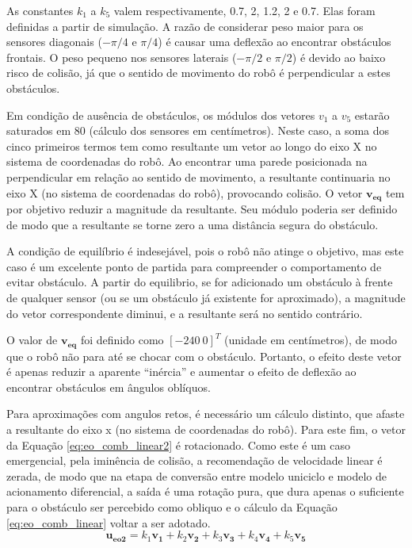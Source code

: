 		As constantes $k_1$ a $k_5$ valem respectivamente, 0.7, 2, 1.2, 2 e 0.7. Elas
		foram definidas a partir de simulação. A razão de considerar peso maior para os sensores
		diagonais ($-\pi/4$ e $\pi/4$) é causar uma deflexão ao encontrar obstáculos frontais. 
		O peso pequeno nos sensores laterais ($-\pi/2$ e $\pi/2$) é devido ao baixo risco de 
		colisão, já que o sentido de movimento do robô é perpendicular a estes obstáculos.
		
		Em condição de ausência de obstáculos, os módulos dos vetores $v_1$ a $v_5$ estarão 
		saturados em 80 (cálculo dos sensores em centímetros). Neste caso, a soma dos cinco 
		primeiros termos tem como resultante um vetor ao longo do eixo X no sistema de 
		coordenadas do robô. Ao encontrar uma parede posicionada na perpendicular em relação 
		ao sentido de movimento, a resultante continuaria no eixo X (no sistema de coordenadas 
		do robô), provocando colisão. 
		O vetor $\mathbf{v_{eq}}$ tem por objetivo reduzir a magnitude da resultante. Seu
		módulo poderia ser definido de modo que a resultante se torne zero a uma distância 
		segura do obstáculo. 
		
		A condição de equilíbrio é indesejável, pois o robô não atinge o objetivo, mas 
		este caso é um excelente ponto de partida para compreender o comportamento
		de evitar obstáculo. A partir do equilibrio, se for adicionado um obstáculo à frente de
		qualquer sensor (ou se um obstáculo já existente for aproximado), a magnitude do vetor
		correspondente diminui, e a resultante será no sentido contrário.
		
		O valor de $\mathbf{v_{eq}}$ foi definido como $[-240 \ 0]^T$ (unidade em centímetros), 
		de modo que o robô não para até se chocar com o obstáculo. Portanto, o efeito deste 
		vetor é apenas reduzir a aparente ``inércia'' e aumentar o efeito de deflexão ao 
		encontrar obstáculos em ângulos oblíquos. 
		
		Para aproximações com angulos retos, é necessário um cálculo distinto, que afaste a 
		resultante do eixo x (no sistema de coordenadas do robô). Para este fim, o vetor da 
		Equação \ref{eq:eo_comb_linear2} é rotacionado. Como este é um caso emergencial, pela
		iminência de colisão, a recomendação de velocidade linear é zerada, de modo que na
		etapa de conversão entre modelo uniciclo e modelo de acionamento diferencial, a saída
		é uma rotação pura, que dura apenas o suficiente para o obstáculo ser percebido como 
		obliquo e o cálculo da Equação \ref{eq:eo_comb_linear} voltar a ser adotado. 
		\begin{equation}
			\label{eq:eo_comb_linear2}
			\mathbf{u_{eo2}} = k_1 \mathbf{v_1} + k_2 \mathbf{v_2} + k_3 \mathbf{v_3} + 
			k_4 \mathbf{v_4} + k_5 \mathbf{v_5}
		\end{equation}
		
